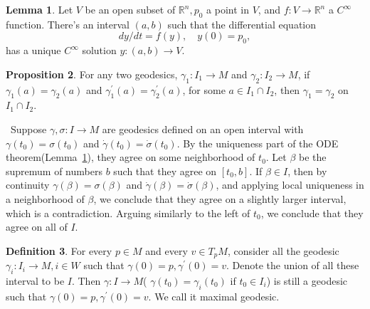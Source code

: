 \documentclass[12pt,a4paper]{book}
\newenvironment{prooff}{{\noindent\it\textcolor{cyan!40!black}{Proof}:}\,}{\par}
\newcommand{\p}{^{\prime}}
\theoremstyle{definition}
\newtheorem{defn}{Definition}[section]
\newtheorem{coro}[defn]{Corollary}
\newtheorem{lem}[defn]{Lemma}
\newtheorem{prop}[defn]{Proposition}
\begin{document}

\begin{lem}
    Let $V$ be an open subset of $\mathbb{R}^n, p_0$ a point in $V$, and $f: V \rightarrow \mathbb{R}^n$ a $C^{\infty}$ function. There's an interval $(a,b)$ such that
    the differential equation
    $$
        dy/dt=f(y), \quad y(0)=p_0,
    $$
    has a unique $C^{\infty}$ solution $y:(a, b) \rightarrow V$.
    \label{lemma: ODE2}
\end{lem}
\begin{prop}
    For any two geodesics, $\gamma_1: I_1 \rightarrow M$ and $\gamma_2: I_2 \rightarrow M$, if $\gamma_1(a)=\gamma_2(a)$ and $\gamma_1^{\prime}(a)=\gamma_2^{\prime}(a)$, for some $a \in I_1 \cap I_2$, then $\gamma_1=\gamma_2$ on $I_1 \cap I_2$.
\end{prop}
\begin{prooff}
    Suppose $\gamma, \sigma: I \rightarrow M$ are geodesics defined on an open interval with $\gamma\left(t_0\right)=\sigma\left(t_0\right)$ and
    $\dot{\gamma}\left(t_0\right)=\dot{\sigma}\left(t_0\right)$.
    By the uniqueness part of the ODE theorem(Lemma~\ref{lemma: ODE2}), they agree on some neighborhood of $t_0$.
    Let $\beta$ be the supremum of numbers $b$ such that they agree on $\left[t_0, b\right]$. If $\beta \in I$, then by continuity $\gamma(\beta)=\sigma(\beta)$ and $\dot{\gamma}(\beta)=\dot{\sigma}(\beta)$,
    and applying local uniqueness in a neighborhood of $\beta$, we conclude that they agree on a slightly larger interval, which is a contradiction. Arguing similarly to the left of $t_0$, we conclude that they agree on all of $I$.
\end{prooff}
\begin{defn}
    For every $p \in M$ and every $v \in T_p M$, consider all the geodesic $\gamma_i:I_i\rightarrow M,i\in W$ such that $\gamma(0)=p, \gamma^{\prime}(0)=v$.
    Denote the union of all these interval to be $I$. Then $\gamma:I\rightarrow M$( $\gamma(t_0)=\gamma_i(t_0)$ if $t_0\in I_i$) is still a geodesic such that $\gamma(0)=p, \gamma^{\prime}(0)=v$.
    We call it maximal geodesic.
\end{defn}
\end{document}
